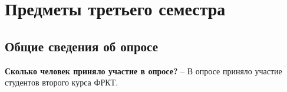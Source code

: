 \section{Предметы третьего семестра}

    \subsection{Общие сведения об опросе}

    \textbf{Сколько человек приняло участие в опросе?} -- В опросе приняло участие  студентов второго курса ФРКТ.

    
    
    
    
    
    